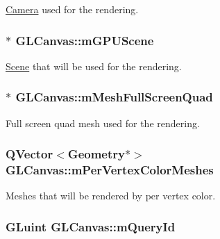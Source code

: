 \hyperlink{class_camera}{Camera} used for the rendering. 

\hypertarget{class_g_l_canvas_a46e82ba1b95d09cbcb42e2db24c4d10a}{
\subsubsection[{m\+G\+P\+U\+Scene}]{$\ast$ G\+L\+Canvas\+::m\+G\+P\+U\+Scene\hspace{0.3cm}{\ttfamily [private]}}}\label{class_g_l_canvas_a46e82ba1b95d09cbcb42e2db24c4d10a}


\hyperlink{class_scene}{Scene} that will be used for the rendering. 

\hypertarget{class_g_l_canvas_a54c05eee19aa86e9619db41fc3555c5a}{
\subsubsection[{m\+Mesh\+Full\+Screen\+Quad}]{$\ast$ G\+L\+Canvas\+::m\+Mesh\+Full\+Screen\+Quad\hspace{0.3cm}{\ttfamily [private]}}}\label{class_g_l_canvas_a54c05eee19aa86e9619db41fc3555c5a}


Full screen quad mesh used for the rendering. 

\hypertarget{class_g_l_canvas_a7c28ed5eaacb35dddc0f8777e6b291ed}{
\subsubsection[{m\+Per\+Vertex\+Color\+Meshes}]{\setlength{\rightskip}{0pt plus 5cm}Q\+Vector$<${\bf Geometry}$\ast$$>$ G\+L\+Canvas\+::m\+Per\+Vertex\+Color\+Meshes\hspace{0.3cm}{\ttfamily [private]}}}\label{class_g_l_canvas_a7c28ed5eaacb35dddc0f8777e6b291ed}


Meshes that will be rendered by per vertex color. 

\hypertarget{class_g_l_canvas_aadd45b922f81b641e051b497c15c6c24}{
\subsubsection[{m\+Query\+Id}]{\setlength{\rightskip}{0pt plus 5cm}G\+Luint G\+L\+Canvas\+::m\+Query\+Id\hspace{0.3cm}{\ttfamily [private]}}}\label{class_g_l_canvas_aadd45b922f81b641e051b497c15c6c24}


